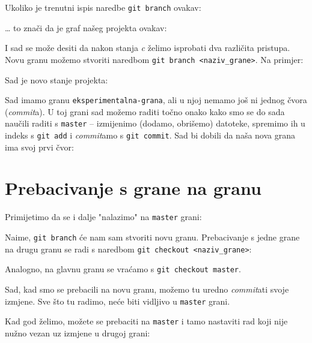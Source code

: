 Ukoliko je trenutni ispis naredbe \verb+git branch+ ovakav:



\dots{} to znači da je graf našeg projekta ovakav:



I sad se može desiti da nakon stanja \emph c želimo isprobati dva različita pristupa.
Novu granu možemo stvoriti naredbom \verb+git branch <naziv_grane>+.
Na primjer:


Sad je novo stanje projekta:



Sad imamo granu \verb+eksperimentalna-grana+, ali u njoj nemamo još ni jednog čvora (\emph{commit}a).
U toj grani sad možemo raditi točno onako kako smo se do sada naučili raditi s \verb+master+ -- izmijenimo (dodamo, obrišemo) datoteke, spremimo ih u indeks s \verb+git add+ i \emph{commit}amo s \verb+git commit+.
Sad bi dobili da naša nova grana ima svoj prvi čvor: 



\section*{Prebacivanje s grane na granu}

Primijetimo da se i dalje "nalazimo" na \verb+master+ grani:



Naime, \verb+git branch+ će nam sam stvoriti novu granu.
Prebacivanje s jedne grane na drugu granu se radi s naredbom \verb+git checkout <naziv_grane>+:



Analogno, na glavnu granu se vraćamo s \verb+git checkout master+.

Sad, kad smo se prebacili na novu granu, možemo tu uredno \emph{commit}ati svoje izmjene. 
Sve što tu radimo, neće biti vidljivo u \verb+master+ grani.



Kad god želimo, možete se prebaciti na \verb+master+ i tamo nastaviti rad koji nije nužno vezan uz izmjene u drugoj grani:



